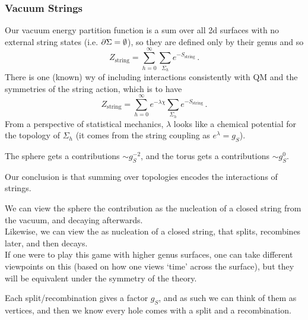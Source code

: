 \documentclass{article}
\begin{document}
\subsubsection{Vacuum Strings}
Our vacuum energy partition function is a sum over all 2d surfaces with no external string states (i.e. $\partial \Sigma = \emptyset$), so they are defined only by their genus and so 
\[
Z_{\text{string}} = \sum_{h = 0}^\infty \sum_{\Sigma_h} e^{-S_{\text{string}}} \, . 
\]
There is one (known) wy of including interactions consistently with QM and the symmetries of the string action, which is to have 
\[
Z_{\text{string}} = \sum_{h =0}^\infty e^{-\lambda \chi} \sum_{\Sigma_h} e^{-S_{\text{string}}} \, .
\]
From a perspective of statistical mechanics, $\lambda$ looks like a chemical potential for the topology of $\Sigma_h$ (it comes from the string coupling as $e^{\lambda} = g_S$).
\begin{example}
	The sphere gets a contributions $\sim g_S^{-2}$, and the torus gets a contributions $\sim g_S^0$. 
\end{example} 
Our conclusion is that summing over topologies encodes the interactions of strings. 
\begin{remark}
	We can view the sphere the contribution as the nucleation of a closed string from the vacuum, and decaying afterwards. \\
	Likewise, we can view the as nucleation of a closed string, that splits, recombines later, and then decays. \\
	If one were to play this game with higher genus surfaces, one can take different viewpoints on this (based on how one views `time' across the surface), but they will be equivalent under the symmetry of the theory. 
\end{remark}
Each split/recombination gives a factor $g_S$, and as such we can think of them as vertices, and then we know every hole comes with a split and a recombination. 

\end{document}
